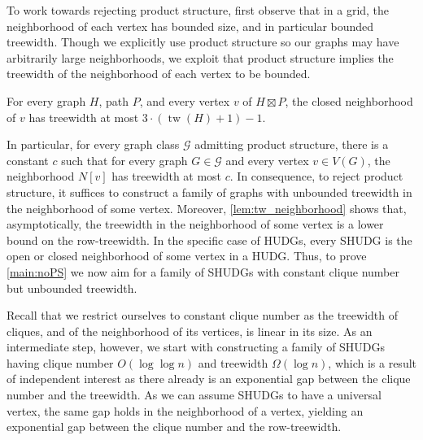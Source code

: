 \documentclass[a4paper,english,cleveref,thm-restate]{lipics-v2021}
\DeclareMathOperator{\tw}{tw}
\begin{document}
To work towards rejecting product structure, first observe that in a grid, the neighborhood of each vertex has bounded size, and in particular bounded treewidth.
Though we explicitly use product structure so our graphs may have arbitrarily large neighborhoods, we exploit that product structure implies the treewidth of the neighborhood of each vertex to be bounded.

\begin{lemma}\label{lem:tw_neighborhood}%
\label{lem:PS_neighboorhood}
    For every graph $H$, path $ P $, and every vertex $v$ of $ H \boxtimes P $, the closed neighborhood of $v$ has treewidth at most $ 3 \cdot (\tw(H) + 1) - 1 $.
\end{lemma}
%
In particular, for every graph class $ \mathcal{G} $ admitting product structure, there is a constant $c$ such that for every graph $G \in \mathcal{G}$ and every vertex $v \in V(G)$, the neighborhood $ N[v] $ has treewidth at most $c$.
In consequence, to reject product structure, it suffices to construct a family of graphs with unbounded treewidth in the neighborhood of some vertex.
Moreover, \cref{lem:tw_neighborhood} shows that, asymptotically, the treewidth in the neighborhood of some vertex is a lower bound on the row-treewidth.
In the specific case of HUDGs, every SHUDG is the open or closed neighborhood of some vertex in a HUDG.
Thus, to prove \cref{main:noPS} we now aim for a family of SHUDGs with constant clique number but unbounded treewidth.

Recall that we restrict ourselves to constant clique number as the treewidth of cliques, and of the neighborhood of its vertices, is linear in its size.
As an intermediate step, however, we start with constructing a family of SHUDGs having clique number $O(\log \log n)$ and treewidth $\Omega(\log n)$, which is a result of independent interest as there already is an exponential gap between the clique number and the treewidth.
As we can assume SHUDGs to have a universal vertex, the same gap holds in the neighborhood of a vertex, yielding an exponential gap between the clique number and the row-treewidth.
\end{document}

